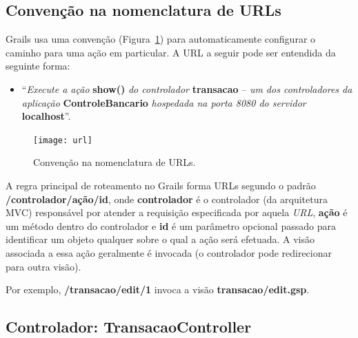 \vspace{0.2cm}

\newpage

\subsection{Convenção na nomenclatura de URLs}\label{secURL}

\vspace{0.5cm}

Grails usa uma convenção (Figura~\ref{urlFig}) para automaticamente configurar o
caminho  para uma  ação em  particular. A  URL a  seguir pode  ser  entendida da
seguinte forma:

\begin{itemize}

\item ``{\it Execute a ação} {\bf show()} {\it do controlador} {\bf transacao} –
  {\it um dos controladores  da aplicação} {\bf ControleBancario} {\it hospedada
    na porta 8080 do servidor} {\bf localhost}''. 

\end{itemize}

\begin{figure}[htbp]
\centering\texttt{[image: url]}
\caption{Convenção na nomenclatura de URLs.}
\label{urlFig}
\end{figure}

A  regra principal  de roteamento  no Grails  forma URLs  segundo o  padrão {\bf
  /controlador/ação/id}, onde {\bf controlador}  é o controlador (da arquitetura
MVC) responsável  por atender  a requisição especificada  por aquela  {\it URL},
{\bf ação} é um método dentro do  controlador e {\bf id} é um parâmetro opcional
passado para identificar  um objeto qualquer sobre o qual  a ação será efetuada.
A  visão  associada  a essa  ação  geralmente  é  invocada (o  controlador  pode
redirecionar para outra visão).  

\begin{cBox}
Por exemplo, {\bf /transacao/edit/1} invoca a visão {\bf transacao/edit.gsp}. 
\end{cBox}

\subsection{Controlador: TransacaoController}\label{secTransacaoController}
\


